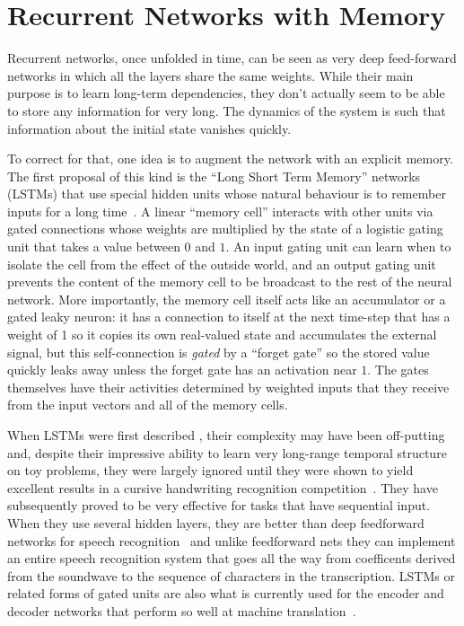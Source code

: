 \documentclass[10pts]{article}
\begin{document}
\section{Recurrent Networks with Memory}

Recurrent networks, once unfolded in time, can be seen as very deep
feed-forward networks in which all the layers share the same weights.
While their main purpose is to learn long-term dependencies, they
don't actually seem to be able to store any information for very
long. The dynamics of the system is such that information about the
initial state vanishes quickly. 

To correct for that, one idea is to augment the network with an
explicit memory. The first proposal of this kind is the ``Long Short
Term Memory'' networks (LSTMs) that use special hidden units whose
natural behaviour is to remember inputs for a long
time~\citep{Hochreiter+Schmidhuber-1997}.  A linear ``memory cell''
interacts with other units via gated connections whose weights are
multiplied by the state of a logistic gating unit that takes a value
between $0$ and $1$. An input gating unit can learn when to isolate
the cell from the effect of the outside world, and an output gating
unit prevents the content of the memory cell to be broadcast to the
rest of the neural network. More importantly, the memory cell itself
acts like an accumulator or a gated leaky neuron: it has a connection
to itself at the next time-step that has a weight of 1 so it copies
its own real-valued state and accumulates the external signal, but
this self-connection is {\em gated} by a ``forget gate'' so the stored
value quickly leaks away unless the forget gate has an activation near
$1$.  The gates themselves have their activities determined by
weighted inputs that they receive from the input vectors and all of
the memory cells.

When LSTMs were first described \citep{Hochreiter+Schmidhuber-1997},
their complexity may have been off-putting and, despite their
impressive ability to learn very long-range temporal structure on toy
problems, they were largely ignored until they were shown to yield
excellent results in a cursive handwriting recognition
competition~\citep{Graves-et-al-2009}. They have subsequently proved
to be very effective for tasks that have sequential input.  When they
use several hidden layers, they are better than deep feedforward
networks for speech recognition~\citep{Graves-et-al-ICASSP2013} and
unlike feedforward nets they can implement an entire speech
recognition system that goes all the way from coefficents derived from
the soundwave to the sequence of characters in the transcription.
LSTMs or related forms of gated units are also what is currently used
for the encoder and decoder networks that perform so well at machine
translation~\citep{Bahdanau-et-al-arxiv2014,Sutskever-et-al-NIPS2014}.
\end{document}
